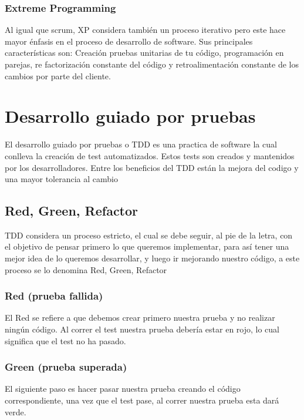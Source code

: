 \subsubsection{Extreme Programming}

Al igual que scrum, XP considera también un proceso iterativo pero este
hace mayor énfasis en el proceso de desarrollo de software. Sus principales
características son: Creación pruebas unitarias de tu código, programación
en parejas, re factorización constante del código y retroalimentación
constante de los cambios por parte del cliente.

\section{Desarrollo guiado por pruebas}

El desarrollo guiado por pruebas o TDD es una practica de software la
cual conlleva la creación de test automatizados. Estos tests son
creados y mantenidos por los desarrolladores. Entre los beneficios
del TDD están la mejora del codigo y una mayor tolerancia al cambio

\subsection{Red, Green, Refactor}

TDD considera un proceso estricto, el cual se debe
seguir, al pie de la letra, con el objetivo de pensar primero lo que queremos
implementar, para así tener una mejor idea de lo queremos desarrollar, y luego
ir mejorando nuestro código, a este proceso se lo denomina Red, Green, Refactor

\subsubsection{Red (prueba fallida)}

El Red se refiere a que debemos crear primero nuestra prueba y no realizar
ningún código. Al correr el test nuestra prueba debería estar en rojo, lo cual
significa que el test no ha pasado.

\subsubsection{Green (prueba superada)}

El siguiente paso es hacer pasar nuestra prueba creando el código
correspondiente, una vez que el test pase, al correr nuestra prueba esta dará
verde.

